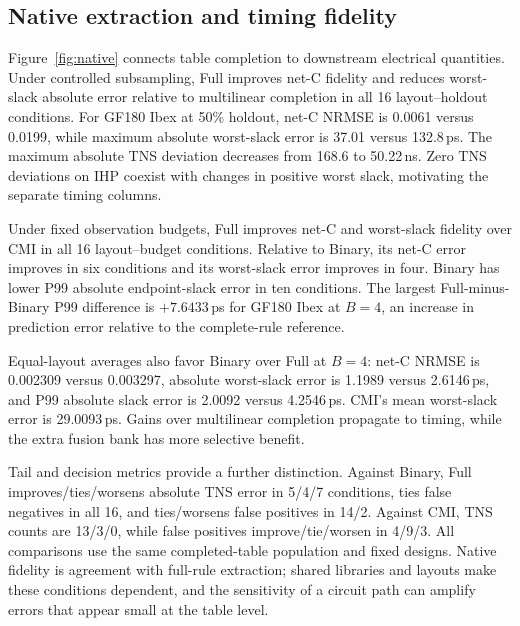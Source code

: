 \documentclass[conference,9pt,letterpaper]{IEEEtran}
\begin{document}
\subsection{Native extraction and timing fidelity}

Figure~\ref{fig:native} connects table completion to downstream electrical quantities. Under controlled subsampling, Full improves net-C fidelity and reduces worst-slack absolute error relative to multilinear completion in all 16 layout--holdout conditions. For GF180 Ibex at 50\% holdout, net-C NRMSE is 0.0061 versus 0.0199, while maximum absolute worst-slack error is 37.01 versus 132.8\,ps. The maximum absolute TNS deviation decreases from 168.6 to 50.22\,ns. Zero TNS deviations on IHP coexist with changes in positive worst slack, motivating the separate timing columns.

Under fixed observation budgets, Full improves net-C and worst-slack fidelity over CMI in all 16 layout--budget conditions. Relative to Binary, its net-C error improves in six conditions and its worst-slack error improves in four. Binary has lower P99 absolute endpoint-slack error in ten conditions. The largest Full-minus-Binary P99 difference is $+7.6433$\,ps for GF180 Ibex at $B=4$, an increase in prediction error relative to the complete-rule reference.

Equal-layout averages also favor Binary over Full at $B=4$: net-C NRMSE is 0.002309 versus 0.003297, absolute worst-slack error is 1.1989 versus 2.6146\,ps, and P99 absolute slack error is 2.0092 versus 4.2546\,ps. CMI's mean worst-slack error is 29.0093\,ps. Gains over multilinear completion propagate to timing, while the extra fusion bank has more selective benefit.

Tail and decision metrics provide a further distinction. Against Binary, Full improves/ties/worsens absolute TNS error in 5/4/7 conditions, ties false negatives in all 16, and ties/worsens false positives in 14/2. Against CMI, TNS counts are 13/3/0, while false positives improve/tie/worsen in 4/9/3. All comparisons use the same completed-table population and fixed designs. Native fidelity is agreement with full-rule extraction; shared libraries and layouts make these conditions dependent, and the sensitivity of a circuit path can amplify errors that appear small at the table level.
\end{document}
